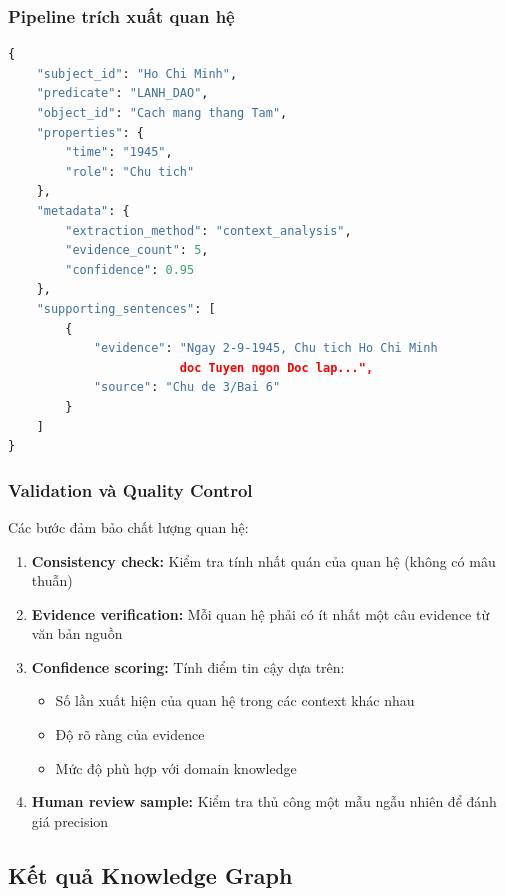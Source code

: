 \subsubsection{Pipeline trích xuất quan hệ}

\begin{lstlisting}[language=Python, caption={Cấu trúc triplet quan hệ}]
{
    "subject_id": "Ho Chi Minh",
    "predicate": "LANH_DAO",
    "object_id": "Cach mang thang Tam",
    "properties": {
        "time": "1945",
        "role": "Chu tich"
    },
    "metadata": {
        "extraction_method": "context_analysis",
        "evidence_count": 5,
        "confidence": 0.95
    },
    "supporting_sentences": [
        {
            "evidence": "Ngay 2-9-1945, Chu tich Ho Chi Minh 
                        doc Tuyen ngon Doc lap...",
            "source": "Chu de 3/Bai 6"
        }
    ]
}
\end{lstlisting}

\subsubsection{Validation và Quality Control}

Các bước đảm bảo chất lượng quan hệ:

\begin{enumerate}
    \item \textbf{Consistency check:} Kiểm tra tính nhất quán của quan hệ (không có mâu thuẫn)
    
    \item \textbf{Evidence verification:} Mỗi quan hệ phải có ít nhất một câu evidence từ văn bản nguồn
    
    \item \textbf{Confidence scoring:} Tính điểm tin cậy dựa trên:
    \begin{itemize}
        \item Số lần xuất hiện của quan hệ trong các context khác nhau
        \item Độ rõ ràng của evidence
        \item Mức độ phù hợp với domain knowledge
    \end{itemize}
    
    \item \textbf{Human review sample:} Kiểm tra thủ công một mẫu ngẫu nhiên để đánh giá precision
\end{enumerate}

\subsection{Kết quả Knowledge Graph}

